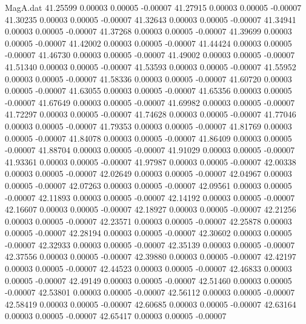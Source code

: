 \begin{filecontents}{MagA.dat}
  41.25599    0.00003    0.00005   -0.00007
  41.27915    0.00003    0.00005   -0.00007
  41.30235    0.00003    0.00005   -0.00007
  41.32643    0.00003    0.00005   -0.00007
  41.34941    0.00003    0.00005   -0.00007
  41.37268    0.00003    0.00005   -0.00007
  41.39699    0.00003    0.00005   -0.00007
  41.42002    0.00003    0.00005   -0.00007
  41.44424    0.00003    0.00005   -0.00007
  41.46730    0.00003    0.00005   -0.00007
  41.49002    0.00003    0.00005   -0.00007
  41.51340    0.00003    0.00005   -0.00007
  41.53593    0.00003    0.00005   -0.00007
  41.55952    0.00003    0.00005   -0.00007
  41.58336    0.00003    0.00005   -0.00007
  41.60720    0.00003    0.00005   -0.00007
  41.63055    0.00003    0.00005   -0.00007
  41.65356    0.00003    0.00005   -0.00007
  41.67649    0.00003    0.00005   -0.00007
  41.69982    0.00003    0.00005   -0.00007
  41.72297    0.00003    0.00005   -0.00007
  41.74628    0.00003    0.00005   -0.00007
  41.77046    0.00003    0.00005   -0.00007
  41.79353    0.00003    0.00005   -0.00007
  41.81769    0.00003    0.00005   -0.00007
  41.84078    0.00003    0.00005   -0.00007
  41.86409    0.00003    0.00005   -0.00007
  41.88704    0.00003    0.00005   -0.00007
  41.91029    0.00003    0.00005   -0.00007
  41.93361    0.00003    0.00005   -0.00007
  41.97987    0.00003    0.00005   -0.00007
  42.00338    0.00003    0.00005   -0.00007
  42.02649    0.00003    0.00005   -0.00007
  42.04967    0.00003    0.00005   -0.00007
  42.07263    0.00003    0.00005   -0.00007
  42.09561    0.00003    0.00005   -0.00007
  42.11893    0.00003    0.00005   -0.00007
  42.14192    0.00003    0.00005   -0.00007
  42.16607    0.00003    0.00005   -0.00007
  42.18927    0.00003    0.00005   -0.00007
  42.21256    0.00003    0.00005   -0.00007
  42.23571    0.00003    0.00005   -0.00007
  42.25878    0.00003    0.00005   -0.00007
  42.28194    0.00003    0.00005   -0.00007
  42.30602    0.00003    0.00005   -0.00007
  42.32933    0.00003    0.00005   -0.00007
  42.35139    0.00003    0.00005   -0.00007
  42.37556    0.00003    0.00005   -0.00007
  42.39880    0.00003    0.00005   -0.00007
  42.42197    0.00003    0.00005   -0.00007
  42.44523    0.00003    0.00005   -0.00007
  42.46833    0.00003    0.00005   -0.00007
  42.49149    0.00003    0.00005   -0.00007
  42.51460    0.00003    0.00005   -0.00007
  42.53801    0.00003    0.00005   -0.00007
  42.56112    0.00003    0.00005   -0.00007
  42.58419    0.00003    0.00005   -0.00007
  42.60685    0.00003    0.00005   -0.00007
  42.63164    0.00003    0.00005   -0.00007
  42.65417    0.00003    0.00005   -0.00007

\end{filecontents}
